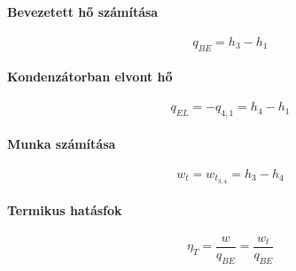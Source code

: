 \paragraph{Bevezetett hő számítása}
	\begin{equation}
		q_{BE} = h_3 - h_1
	\end{equation}
\paragraph{Kondenzátorban elvont hő}
	\begin{equation}
		q_{EL} = - q_{4,1} = h_4 - h_1
	\end{equation}
\paragraph{Munka számítása}
	\begin{equation}
		w_t = w_{t_{3,4}} = h_3-h_4
	\end{equation}
\paragraph{Termikus hatásfok}
	\begin{equation}
		\eta_T = \frac{w}{q_{BE}} = \frac{w_t}{q_{BE}}
	\end{equation}